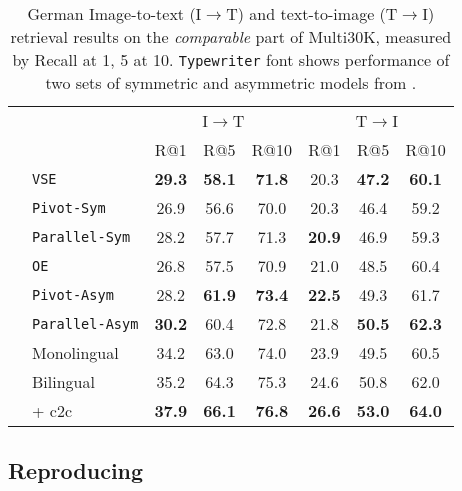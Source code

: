 \begin{table*}[h!]
\centering
\renewcommand{\arraystretch}{1.3}
\begin{tabular}{llcccccc}
\toprule
& & \multicolumn{3}{c}{I$\rightarrow$T}  & \multicolumn{3}{c}{T$\rightarrow$I}   \\
 						& & R@1 & R@5 & R@10 & R@1 & R@5 & R@10 \\
\cmidrule{3-8}
\parbox[t]{2mm}{} & {\tt VSE} 			 	& \bf{29.3} & \bf{58.1} & \bf{71.8} & 20.3 & \bf{47.2} & \bf{60.1}\\
& {\tt Pivot-Sym}			& 26.9  & 56.6  & 70.0 & 20.3 & 46.4 & 59.2 \\
& {\tt Parallel-Sym}      & 28.2  & 57.7  & 71.3 & \bf{20.9} & 46.9 & 59.3 \\
\midrule
\parbox[t]{2mm}{} & {\tt OE} 				& 26.8 & 57.5 & 70.9 & 21.0 & 48.5 & 60.4 \\
& {\tt Pivot-Asym} 		& 28.2 & \bf{61.9} & \bf{73.4} & \bf{22.5} & 49.3 & 61.7 \\
& {\tt Parallel-Asym}     & \bf{30.2} & 60.4 & 72.8 & 21.8 & \bf{50.5} & \bf{62.3} \\
\midrule
& Monolingual				& 34.2 & 63.0 & 74.0 & 23.9 & 49.5 & 60.5\\
& Bilingual 				& 35.2 & 64.3 & 75.3 & 24.6 & 50.8 & 62.0\\
& + c2c     				& \bf{37.9} & \bf{66.1} & \bf{76.8} & \bf{26.6} & \bf{53.0} & \bf{64.0} \\
\bottomrule
\end{tabular}
\caption{German Image-to-text (I$\rightarrow$T) and text-to-image (T$\rightarrow$I) retrieval results on the \emph{comparable} part of Multi30K, measured by Recall at 1, 5 at 10. {\tt Typewriter} font shows performance of two sets of symmetric and asymmetric models from \citet{gella2017image}.}
\label{tab:bi:bilingualGer}
\end{table*}


\subsection{Reproducing \citet{gella2017image}}
\label{sec:gella}

